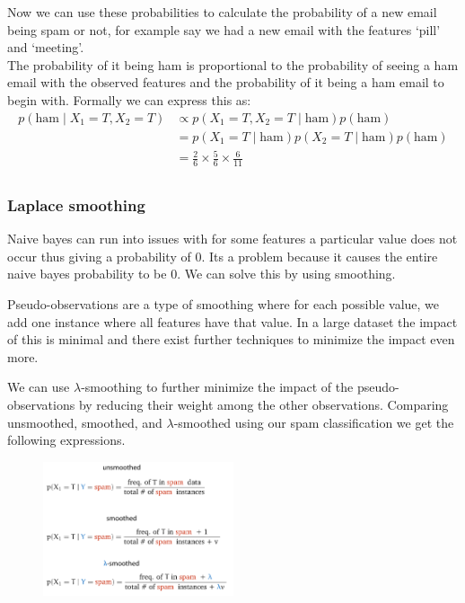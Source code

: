 \documentclass[12pt]{article}
\begin{document}
Now we can use these probabilities to calculate the probability of a new email being spam or not, for example say we had a new email with the features `pill' and `meeting'. \\
The probability of it being ham is proportional to the probability of seeing a ham email with the observed features and the probability of it being a ham email to begin with. Formally we can express this as:
\begin{align*}
    p(\text{ham}\mid X_1=T, X_2=T) & \propto p(X_1=T, X_2=T\mid \text{ham})p(\text{ham}) \\
    & = p(X_1=T\mid \text{ham})p(X_2=T\mid \text{ham})p(\text{ham}) \\
    & = \frac{2}{6}\times\frac{5}{6}\times\frac{6}{11} \\
\end{align*}

\subsubsection*{Laplace smoothing}

Naive bayes can run into issues with for some features a particular value does not occur thus giving a probability of 0. Its a problem because it causes the entire naive bayes probability to be 0. We can solve this by using smoothing.

\begin{definition}
    Pseudo-observations are a type of smoothing where for each possible value, we add one instance where all features have that value. In a large dataset the impact of this is minimal and there exist further techniques to minimize the impact even more.
\end{definition}

We can use $\lambda$-smoothing to further minimize the impact of the pseudo-observations by reducing their weight among the other observations. Comparing unsmoothed, smoothed, and $\lambda$-smoothed using our spam classification we get the following expressions.

\begin{figure}
    \centering
    \includegraphics[width=0.5\textwidth]{assets/smootheddata.png}    
\end{figure}
\end{document}
